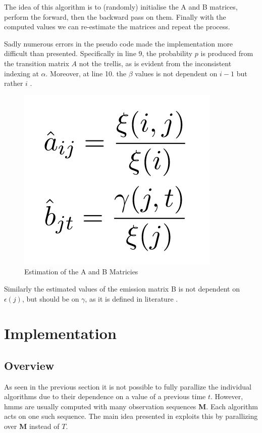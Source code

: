 \documentclass[english, paper=a4]{scrartcl}
\begin{document}
The idea of this algorithm is to (randomly) initialise the A and B matrices, perform the forward, then the backward pass on them. Finally with the computed values we can re-estimate the matrices and repeat the process.

Sadly numerous errors in the pseudo code made the implementation more difficult than presented. Specifically in line 9, the probability \(p\) is produced from the transition matrix \(A\) not the trellis, as is evident from the inconsistent indexing at \(\alpha\). Moreover, at line 10. the \(\beta\) values is not dependent on \(i-1\) but rather \(i\) \cite{hmm}. 

\begin{figure}[H]

\centering
\includegraphics[scale=0.4]{"estimation"}
 \caption{Estimation of the A and B Matricies \cite{cuhmm}}

\end{figure}

Similarly the estimated values of the emission matrix B is not dependent on \(\epsilon(j)\), but should be on \(\gamma\), as it is defined in literature \cite{hmm}. 

\newpage


\section{Implementation}

\subsection{Overview}

As seen in the previous section it is not possible to fully parallize the individual algorithms due to their dependence on a value of a previous time \(t\). However, hmms are usually computed with many observation sequences \textbf{M}. Each algorithm acts on one such sequence. The main idea presented in \cite{cuhmm} exploits this by parallizing over \textbf{M} instead of \(T\). 
\end{document}
